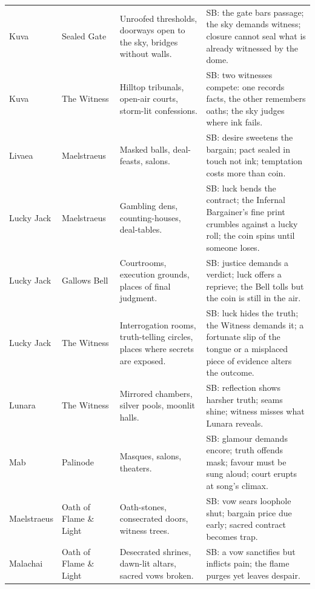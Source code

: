 \begin{longtable}{@{}p{3.3cm}p{3.3cm}p{4.6cm}p{7.2cm}@{}}
  Kuva & Sealed Gate &
  Unroofed thresholds, doorways open to the sky, bridges without walls. &
  SB: the gate bars passage; the sky demands witness; closure cannot seal what is already witnessed by the dome. \\
  
  Kuva & The Witness &
  Hilltop tribunals, open-air courts, storm-lit confessions. &
  SB: two witnesses compete: one records facts, the other remembers oaths; the sky judges where ink fails. \\

  Livaea & Maelstraeus &
  Masked balls, deal-feasts, salons. &
  SB: desire sweetens the bargain; pact sealed in touch not ink; temptation costs more than coin. \\

  Lucky Jack & Maelstraeus &
  Gambling dens, counting-houses, deal-tables. &
  SB: luck bends the contract; the Infernal Bargainer's fine print crumbles against a lucky roll; the coin spins until someone loses. \\

  Lucky Jack & Gallows Bell &
  Courtrooms, execution grounds, places of final judgment. &
  SB: justice demands a verdict; luck offers a reprieve; the Bell tolls but the coin is still in the air. \\

  Lucky Jack & The Witness &
  Interrogation rooms, truth-telling circles, places where secrets are exposed. &
  SB: luck hides the truth; the Witness demands it; a fortunate slip of the tongue or a misplaced piece of evidence alters the outcome. \\

  Lunara & The Witness &
  Mirrored chambers, silver pools, moonlit halls. &
  SB: reflection shows harsher truth; seams shine; witness misses what Lunara reveals. \\

  Mab & Palinode &
  Masques, salons, theaters. &
  SB: glamour demands encore; truth offends mask; favour must be sung aloud; court erupts at song's climax. \\

  Maelstraeus & Oath of Flame \& Light &
  Oath-stones, consecrated doors, witness trees. &
  SB: vow sears loophole shut; bargain price due early; sacred contract becomes trap. \\

  Malachai & Oath of Flame \& Light &
  Desecrated shrines, dawn-lit altars, sacred vows broken. &
  SB: a vow sanctifies but inflicts pain; the flame purges yet leaves despair. \\


\end{longtable}

